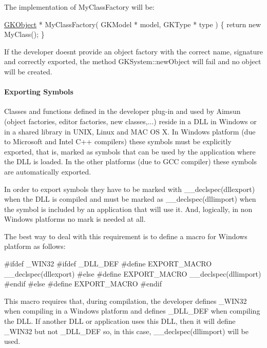 The implementation of My\+Class\+Factory will be\+:


\begin{DoxyCode}
\hyperlink{classGKObject}{GKObject} * MyClassFactory( GKModel * model, GKType * type )
\{
    \textcolor{keywordflow}{return} \textcolor{keyword}{new} MyClass();
\}
\end{DoxyCode}


If the developer doesn\textquotesingle{}t provide an object factory with the correct name, signature and correctly exported, the method G\+K\+System\+::new\+Object will fail and no object will be created.

\paragraph*{Exporting Symbols}

Classes and functions defined in the developer plug-\/in and used by Aimsun (object factories, editor factories, new classes,...) reside in a D\+LL in Windows or in a shared library in U\+N\+IX, Linux and M\+AC OS X. In Windows platform (due to Microsoft and Intel C++ compilers) these symbols must be explicitly exported, that is, marked as symbols that can be used by the application where the D\+LL is loaded. In the other platforms (due to G\+CC compiler) these symbols are automatically exported.

In order to export symbols they have to be marked with {\ttfamily \+\_\+\+\_\+declspec(dllexport)} when the D\+LL is compiled and must be marked as {\ttfamily \+\_\+\+\_\+declspec(dllimport)} when the symbol is included by an application that will use it. And, logically, in non Windows platforms no mark is needed at all.

The best way to deal with this requirement is to define a macro for Windows platform as follows\+:


\begin{DoxyCode}
\textcolor{preprocessor}{#ifdef \_WIN32}
\textcolor{preprocessor}{    #ifdef \_DLL\_DEF}
\textcolor{preprocessor}{        #define EXPORT\_MACRO \_\_declspec(dllexport)}
\textcolor{preprocessor}{    #else}
\textcolor{preprocessor}{        #define EXPORT\_MACRO \_\_declspec(dllimport)}
\textcolor{preprocessor}{    #endif}
\textcolor{preprocessor}{#else}
\textcolor{preprocessor}{    #define EXPORT\_MACRO }
\textcolor{preprocessor}{#endif}
\end{DoxyCode}


This macro requires that, during compilation, the developer defines \+\_\+\+W\+I\+N32 when compiling in a Windows platform and defines \+\_\+\+D\+L\+L\+\_\+\+D\+EF when compiling the D\+LL. If another D\+LL or application uses this D\+LL, then it will define \+\_\+\+W\+I\+N32 but not \+\_\+\+D\+L\+L\+\_\+\+D\+EF so, in this case, \+\_\+\+\_\+declspec(dllimport) will be used.

